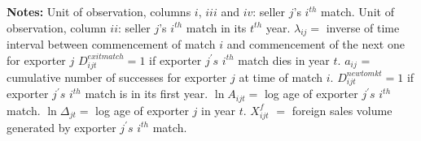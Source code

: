 \documentclass[12pt]{article}
\begin{document}
\begin{table}[tbp]
{
}\endcenter
\par
\begin{tablenotes}
\item \textbf{Notes:} Unit of observation, columns $i$,  $iii$ and $iv$: seller $ j$'s $i^{th}$ match. Unit of observation, column $ii$: seller $ j$'s $i^{th}$ match in its $t^{th}$ year. $\lambda_{ij}=$ inverse of time interval between commencement of match $i$ and commencement of the next one for exporter $j$ $D_{ijt}^{exit match}=1$ if exporter $j^{\prime }s$ $i^{th}$ match dies in year $t$. $a_{ij} $ = cumulative number of successes for exporter $j$ at time of match $i$. $D_{ijt}^{new to mkt}=1$ if exporter $j^{\prime }s$ $i^{th}$ match is in its first year. $\ln A_{ijt}=$ log age of exporter $j^{\prime }s$ $i^{th}$  match. $\ln \Delta_{jt} =$ log age of exporter $j$ in year $t$. $X_{ijt}^{f}$ $=$ foreign sales volume generated by exporter $j^{\prime }s$ $i^{th}$ match.
\end{tablenotes}
\end{table}
\end{document}
